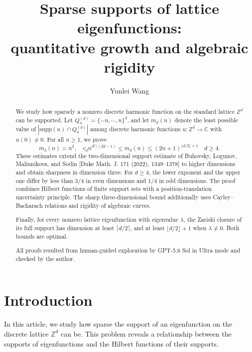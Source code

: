 \documentclass[11pt,reqno]{amsart}
\title[Sparse supports of lattice eigenfunctions]{Sparse supports of lattice eigenfunctions:\\
quantitative growth and algebraic rigidity}
\author[Y.~Wang]{Yunlei Wang}
\newcommand\Z{\ensuremath{\mathbb{Z}}}
\theoremstyle{definition}
\theoremstyle{plain}
\numberwithin{equation}{section}
\begin{document}
\begin{abstract} 
We study how sparsely a nonzero discrete harmonic function on the standard
lattice $\mathbb{Z}^d$ can be supported. Let $Q_n^{(d)}=\{-n,\cdots,n\}^d$, and let
$m_d(n)$ denote the least possible value of $|\mathrm{supp}(u)\cap Q_n^{(d)}|$ among discrete harmonic functions
$u:\mathbb{Z}^d\to\mathbb{C}$ with $u(0)\neq0$. For all $n\geq1$, we prove
\begin{equation*}
    m_3(n)\asymp n^2,
    \quad
    c_dn^{d^2/(2d-1)}
    \leq m_d(n)\leq
    (2n+1)^{\lfloor d/2\rfloor+1}
    \quad d\ge 4.
\end{equation*}
These estimates extend the two-dimensional support estimate of
Buhovsky, Logunov, Malinnikova, and Sodin
[Duke Math. J. 171 (2022), 1349--1378] to higher dimensions and obtain sharpness in dimension three. For $d\geq4$,
the lower exponent and the upper one differ by less than
$3/4$ in even dimensions and $1/4$ in odd dimensions. The proof combines Hilbert functions of finite support sets with a
position-translation uncertainty principle. The sharp three-dimensional
bound additionally uses Cayley--Bacharach relations and rigidity of
algebraic curves. 

Finally, for every nonzero lattice eigenfunction with
eigenvalue $\lambda$, the Zariski closure of its full support has dimension
at least $\lceil d/2\rceil$, and at least $\lfloor d/2\rfloor+1$ when
$\lambda\neq0$. Both bounds are optimal.

All proofs resulted from human-guided exploration by GPT-5.6 Sol in Ultra mode and checked by the author.
\end{abstract}

\maketitle




{
\setcounter{tocdepth}{1}
\tableofcontents
}



\section{Introduction}
In this article, we study how sparse the support of an eigenfunction on the discrete lattice $\Z^d$ can be. This problem reveals a relationship between the supports of eigenfunctions and the Hilbert functions of their supports.
\end{document}
